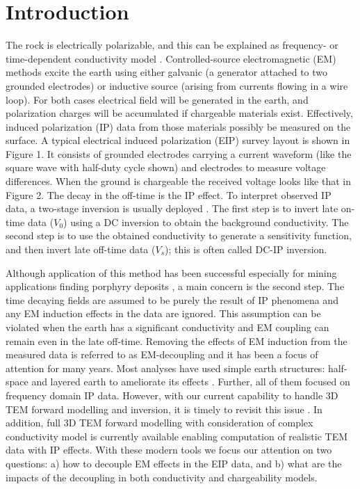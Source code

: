 \documentclass[paper]{geophysics}
\begin{document}

\section{Introduction}
The rock is electrically polarizable, and this can be explained as frequency- or time-dependent conductivity model \cite[]{Pelton1978,Tarasov2013,Placencia2014,Revil2015}. Controlled-source electromagnetic (EM) methods excite the earth using either galvanic (a generator attached to two grounded electrodes) or inductive source (arising from currents flowing in a wire loop). For both cases electrical field will be generated in the earth, and polarization charges will be accumulated if chargeable materials exist. Effectively, induced polarization (IP) data from those materials possibly be measured on the surface. A typical electrical induced polarization (EIP) survey layout \cite[]{seigel1974} is shown in Figure 1. It consists of grounded electrodes carrying a current waveform (like the square wave with half-duty cycle shown) and electrodes to measure voltage differences. When the ground is chargeable the received voltage looks like that in Figure 2. The decay in the off-time is the IP effect. To interpret observed IP data, a two-stage inversion is usually deployed \cite[]{doug1994}. The first step is to invert late on-time data ($V_0$) using a DC inversion to obtain the background conductivity. The second step is to use the obtained conductivity to generate a sensitivity function, and then invert late off-time data ($V_s$); this is often called DC-IP inversion.

Although application of this method has been successful especially for mining applications finding porphyry deposits \cite[]{Fink1990,DougMilli1997}, a main concern is the second step. The time decaying fields are assumed to be purely the result of IP phenomena and any EM induction effects in the data are ignored. This assumption can be violated when the earth has a significant conductivity and  EM coupling can remain even in the late off-time. Removing the effects of EM induction from the measured data is referred to as EM-decoupling and it has been a focus of attention for many years. Most analyses have used simple earth structures: half-space and layered earth to ameliorate its effects \cite[]{routh2001,Wait1986,Wynn1975}. Further, all of them focused on frequency domain IP data. However, with our current capability to handle 3D TEM forward modelling and inversion, it is timely to revisit this issue \cite[]{Um2010,Commer2004,Oldenburg2013}. In addition, full 3D TEM forward modelling with consideration of complex conductivity model is currently available \cite[]{Marchant2014} enabling computation of realistic TEM data with IP effects. With these modern tools we focus our attention on two questions: a) how to decouple EM effects in the EIP data, and b) what are the impacts of the decoupling in both conductivity and chargeability models.
\end{document}
